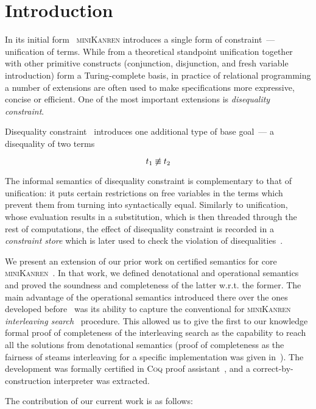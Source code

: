 \section{Introduction}

In its initial form~\cite{TRS,MicroKanren} \textsc{miniKanren} introduces a single
form of constraint~--- unification of terms. While from a theoretical standpoint unification together with other primitive constructs (conjunction, disjunction, and
fresh variable introduction) form a Turing-complete basis, in practice of relational programming a number of extensions are often used to make specifications more
expressive, concise or efficient. One of the most important extensions is \emph{disequality constraint}.

Disequality constraint~\cite{Disunification} introduces one additional type of base goal~--- a disequality of two terms

\[
t_1 \not\equiv t_2
\]

The informal semantics of disequality constraint is complementary to that of unification: it puts certain restrictions on free variables in the terms which
prevent them from turning into syntactically equal. Similarly to unification, whose evaluation results in a substitution, which is then threaded through
the rest of computations, the effect of disequality constraint is recorded in a \emph{constraint store} which is later used to check the violation of
disequalities~\cite{CKanren}.

We present an extension of our prior work on certified semantics for core \textsc{miniKanren}~\cite{CertifiedSemantics}. In that work, we
defined denotational and operational semantics and proved the soundness and completeness of the latter w.r.t. the former. 
The main advantage of the operational semantics introduced there over the ones developed before~\cite{MechanisingMiniKanren, RelConversion, DivTest}
was its ability to capture the conventional for \textsc{miniKanren} \emph{interleaving search}~\cite{Search} procedure.
This allowed us to give the first to our knowledge formal proof of completeness of the interleaving search
as the capability to reach all the solutions from denotational semantics
(proof of completeness as the fairness of steams interleaving for a specific implementation was given in~\cite{SmallEmbedding}).
The development was formally certified in \textsc{Coq} proof assistant~\cite{Coq}, and a correct-by-construction interpreter was extracted.

The contribution of our current work is as follows:

